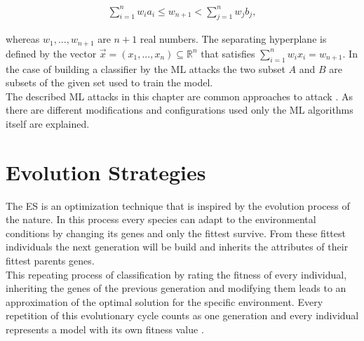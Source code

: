 \begin{align}
\sum_{i=1}^{n} w_i a_i \le w_{n + 1} < \sum_{j=1}^{n} w_j b_j, \label{equ:linearseparable}
\end{align}

whereas $w_1, ..., w_{n + 1}$ are $n + 1$ real numbers.
The separating hyperplane is defined by the vector $\vec{x} = (x_1, ..., x_n) \subseteq \mathbb{R}^n$ that satisfies $\sum_{i = 1}^{n} w_i x_i = w_{n + 1}$.%
In the case of building a classifier by the \ac{ML} attacks the two subset $A$ and $B$ are subsets of the given set used to train the model.\\
The described \ac{ML} attacks in this chapter are common approaches to attack \pufs \cite{Ruhrmair2014PUFOverview}.
As there are different modifications and configurations used only the \ac{ML} algorithms itself are explained.

% 
% 
% 

\section{Evolution Strategies}
\label{sec:evolutionstrategies}

The \acf{ES} is an optimization technique that is inspired by the evolution process of the nature.
In this process every species can adapt to the environmental conditions by changing its genes and only the fittest survive.
From these fittest individuals the next generation will be build and inherits the attributes of their fittest parents genes.\\
This repeating process of classification by rating the fitness of every individual, inheriting the genes of the previous generation and modifying them leads to an approximation of the optimal solution for the specific environment.
Every repetition of this evolutionary cycle counts as one generation and every individual represents a model with its own fitness value	\cite{Becker2015ThePUFs}. %

